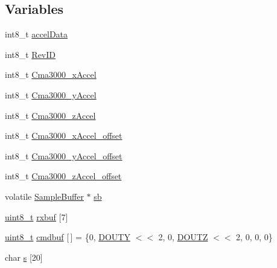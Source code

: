 \subsection*{\-Variables}
\begin{DoxyCompactItemize}
\item 
int8\-\_\-t \hyperlink{group__HAL__Cma3000_ga2463200b1bea9027c65cd6a7988b92cc}{accel\-Data}
\item 
int8\-\_\-t \hyperlink{group__HAL__Cma3000_gab84df94ff0cd4d502b2faae204b4d24f}{\-Rev\-I\-D}
\item 
int8\-\_\-t \hyperlink{group__HAL__Cma3000_gac2f4ad3ece4f2cb31fedfa8628ac1688}{\-Cma3000\-\_\-x\-Accel}
\item 
int8\-\_\-t \hyperlink{group__HAL__Cma3000_ga847617eef332231c449861a1475e8345}{\-Cma3000\-\_\-y\-Accel}
\item 
int8\-\_\-t \hyperlink{group__HAL__Cma3000_ga862a9e332db3dc346369fb5fc4ef2e07}{\-Cma3000\-\_\-z\-Accel}
\item 
int8\-\_\-t \hyperlink{group__HAL__Cma3000_ga335dff88b3e8e05ee7d26177f734faf8}{\-Cma3000\-\_\-x\-Accel\-\_\-offset}
\item 
int8\-\_\-t \hyperlink{group__HAL__Cma3000_ga71431a853962e1aab0d44b3901d9ce53}{\-Cma3000\-\_\-y\-Accel\-\_\-offset}
\item 
int8\-\_\-t \hyperlink{group__HAL__Cma3000_gaeed4d3e43f6b93fad6b1a8176f3b4ef5}{\-Cma3000\-\_\-z\-Accel\-\_\-offset}
\item 
volatile \hyperlink{structSampleBuffer}{\-Sample\-Buffer} $\ast$ \hyperlink{group__HAL__Cma3000_ga13d2ec11123575d9acaa32e40eb4fa8b}{sb}
\item 
\hyperlink{typedefs_8h_aba7bc1797add20fe3efdf37ced1182c5}{uint8\-\_\-t} \hyperlink{group__HAL__Cma3000_gaacf8a00ccb887c06968f98f27def8716}{rxbuf} \mbox{[}7\mbox{]}
\item 
\hyperlink{typedefs_8h_aba7bc1797add20fe3efdf37ced1182c5}{uint8\-\_\-t} \hyperlink{group__HAL__Cma3000_gab3dbd75bdfcd17ed7daed83b67e55d25}{cmdbuf} \mbox{[}$\,$\mbox{]} = \{0, \hyperlink{accel_8h_a2d5b60fb9f1b096949528febf596b114}{\-D\-O\-U\-T\-Y} $<$$<$ 2, 0, \hyperlink{accel_8h_a41ef57dfc28efea7d50b295d020a5149}{\-D\-O\-U\-T\-Z} $<$$<$ 2, 0, 0, 0\}
\item 
char \hyperlink{group__HAL__Cma3000_ga729a0a31c6732422f598675267b8cb2d}{s} \mbox{[}20\mbox{]}
\end{DoxyCompactItemize}


